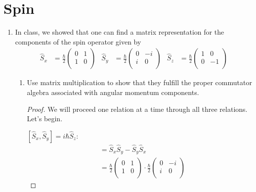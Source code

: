 \documentclass[../psets.tex]{subfiles}
\begin{document}
\section{Spin}
\begin{enumerate}
    \item {}In class, we showed that one can find a matrix representation for the components of the spin operator given by
    \begin{align}
        \hat{S}_x &= \frac{\hbar}{2}
        \begin{pmatrix}
            0 & 1\\
            1 & 0\\
        \end{pmatrix}&
        \hat{S}_y &= \frac{\hbar}{2}
        \begin{pmatrix}
            0 & -i\\
            i & 0\\
        \end{pmatrix}&
        \hat{S}_z &= \frac{\hbar}{2}
        \begin{pmatrix}
            1 & 0\\
            0 & -1\\
        \end{pmatrix}
    \end{align}
    \begin{enumerate}
        \item Use matrix multiplication to show that they fulfill the proper commutator algebra associated with angular momentum components.
        \begin{proof}
            We will proceed one relation at a time through all three relations. Let's begin.\par
            \underline{$[\hat{S}_x,\hat{S}_y]=i\hbar\hat{S}_z$}:
            \begin{align*}
                [\hat{S}_x,\hat{S}_y] &= \hat{S}_x\hat{S}_y-\hat{S}_y\hat{S}_x\\
                &= \frac{\hbar}{2}
                \begin{pmatrix}
                    0 & 1\\
                    1 & 0\\
                \end{pmatrix}
                \cdot\frac{\hbar}{2}
                \begin{pmatrix}
                    0 & -i\\
                    i & 0\\

\end{pmatrix}
\end{align*}
\end{proof}
\end{enumerate}
\end{enumerate}
\end{document}
